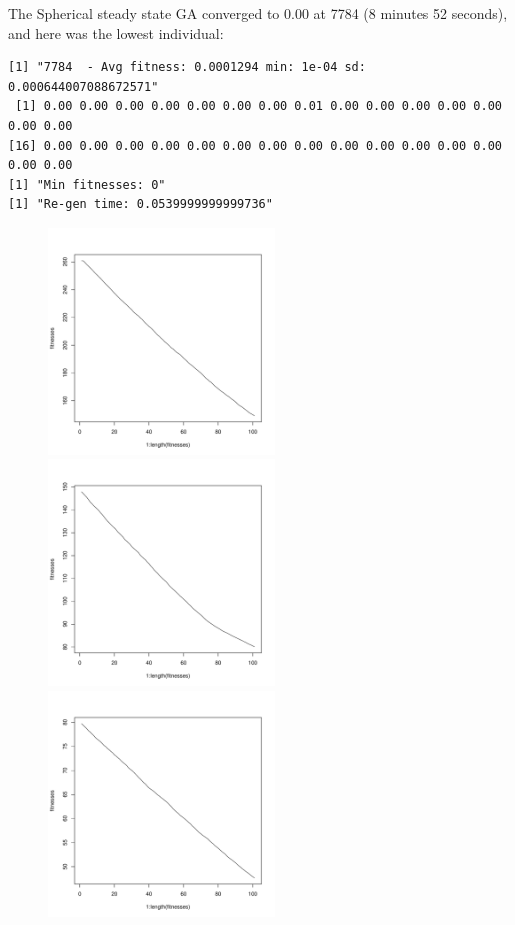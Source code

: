 \documentclass[12pt]{article}
\begin{document}
The Spherical steady state GA converged to 0.00 at 7784 (8 minutes 52 seconds), and here was the lowest individual:
\scriptsize
\begin{lstlisting}
[1] "7784  - Avg fitness: 0.0001294 min: 1e-04 sd: 0.000644007088672571"
 [1] 0.00 0.00 0.00 0.00 0.00 0.00 0.00 0.01 0.00 0.00 0.00 0.00 0.00 0.00 0.00
[16] 0.00 0.00 0.00 0.00 0.00 0.00 0.00 0.00 0.00 0.00 0.00 0.00 0.00 0.00 0.00
[1] "Min fitnesses: 0"
[1] "Re-gen time: 0.0539999999999736"
\end{lstlisting}
\normalsize


\begin{figure}[!h]
        \begin{center}
		\includegraphics[width=60mm]{images/spherical.ss/avg_101.pdf}
		\includegraphics[width=60mm]{images/spherical.ss/avg_202.pdf}
		\includegraphics[width=60mm]{images/spherical.ss/avg_303.pdf}

\end{center}
\end{figure}
\end{document}
